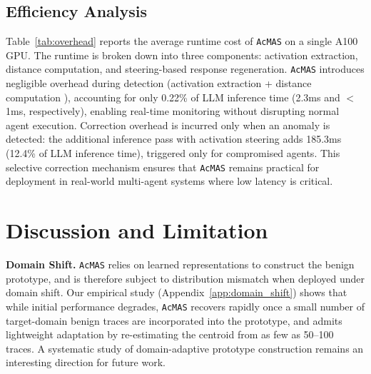\documentclass{article}
\newcommand{\app}{\texttt{AcMAS}}
\theoremstyle{plain}
\theoremstyle{definition}
\theoremstyle{remark}
\begin{document}
\subsection{Efficiency Analysis}
Table~\ref{tab:overhead} reports the 
average runtime cost of \app{} on a single A100 GPU. The runtime is broken down into 
three components: activation extraction, distance computation, 
and steering-based response regeneration. \app{} introduces negligible overhead during detection (activation extraction + distance computation ), accounting for only 0.22\% of LLM inference time (2.3ms and $<$1ms, respectively), enabling real-time monitoring without disrupting normal agent execution. Correction overhead is incurred only when an anomaly is detected: the additional inference pass with activation steering adds 185.3ms (12.4\% of LLM inference time), triggered only for compromised agents. This selective correction mechanism ensures that \app{} remains practical for deployment in real-world multi-agent systems where low latency is critical.

\begin{table}[h]
\caption{Computational latency and overhead analysis.}
\label{tab:overhead}
\centering
{}
\end{table}


\section{Discussion and Limitation}
\noindent\textbf{Domain Shift.} \app{} relies on learned representations to construct the benign prototype, and is therefore subject to distribution mismatch when deployed under domain shift. Our empirical study (Appendix~\ref{app:domain_shift}) shows that while initial performance degrades, \app{} recovers rapidly once a small number of target-domain benign traces are incorporated into the prototype, and admits lightweight adaptation by re-estimating the centroid from as few as 50--100 traces. A systematic study of domain-adaptive prototype construction remains an interesting direction for future work.
\end{document}
